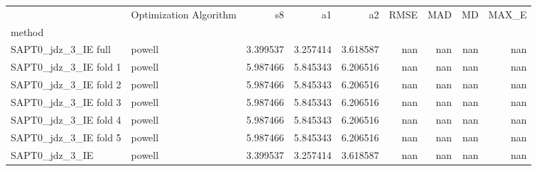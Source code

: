 \begin{tabular}{llrrrrrrr}
 & Optimization Algorithm & s8 & a1 & a2 & RMSE & MAD & MD & MAX_E \\
method &  &  &  &  &  &  &  &  \\
SAPT0_jdz_3_IE full & powell & 3.399537 & 3.257414 & 3.618587 & nan & nan & nan & nan \\
SAPT0_jdz_3_IE fold 1 & powell & 5.987466 & 5.845343 & 6.206516 & nan & nan & nan & nan \\
SAPT0_jdz_3_IE fold 2 & powell & 5.987466 & 5.845343 & 6.206516 & nan & nan & nan & nan \\
SAPT0_jdz_3_IE fold 3 & powell & 5.987466 & 5.845343 & 6.206516 & nan & nan & nan & nan \\
SAPT0_jdz_3_IE fold 4 & powell & 5.987466 & 5.845343 & 6.206516 & nan & nan & nan & nan \\
SAPT0_jdz_3_IE fold 5 & powell & 5.987466 & 5.845343 & 6.206516 & nan & nan & nan & nan \\
SAPT0_jdz_3_IE & powell & 3.399537 & 3.257414 & 3.618587 & nan & nan & nan & nan \\
\end{tabular}
